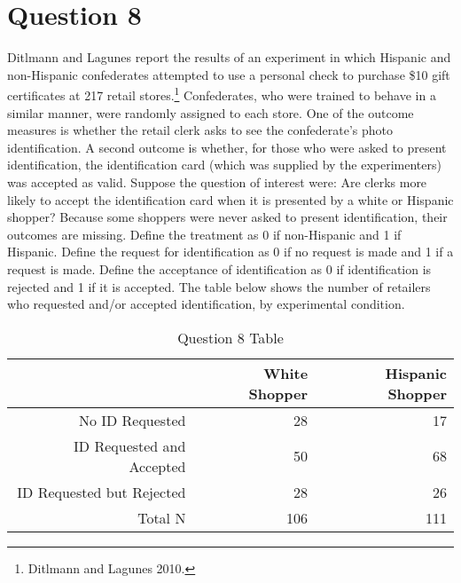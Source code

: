 \documentclass[11pt,notitlepage]{article}\usepackage[]{graphicx}\usepackage[]{color}
\begin{document}
\section*{Question 8}
Ditlmann and Lagunes report the results of an experiment in which Hispanic and non-Hispanic confederates attempted to use a personal check to purchase \$10 gift certificates at 217 retail stores.\footnote{Ditlmann and Lagunes 2010.} Confederates, who were trained to behave in a similar manner, were randomly assigned to each store. One of the outcome measures is whether the retail clerk asks to see the confederate's photo identification. A second outcome is whether, for those who were asked to present identification, the identification card (which was supplied by the experimenters) was accepted as valid. Suppose the question of interest were: Are clerks more likely to accept the identification card when it is presented by a white or Hispanic shopper? Because some shoppers were never asked to present identification, their outcomes are missing. Define the treatment as 0 if non-Hispanic and 1 if Hispanic. Define the request for identification as 0 if no request is made and 1 if a request is made. Define the acceptance of identification as 0 if identification is rejected and 1 if it is accepted. The table below shows the number of retailers who requested and/or accepted identification, by experimental condition.

\begin{table}[htbp]
  \centering
  \caption{Question 8 Table}
    \begin{tabular}{rrr}
    \toprule
          & White Shopper  & Hispanic Shopper  \\
    \midrule
    No ID Requested  & 28    & 17 \\
    ID Requested and Accepted  & 50    & 68 \\
    ID Requested but Rejected  & 28    & 26 \\
    Total N  & 106   & 111 \\
    \bottomrule
    \end{tabular}%
  \label{tab:addlabel}%
\end{table}%
\end{document}
